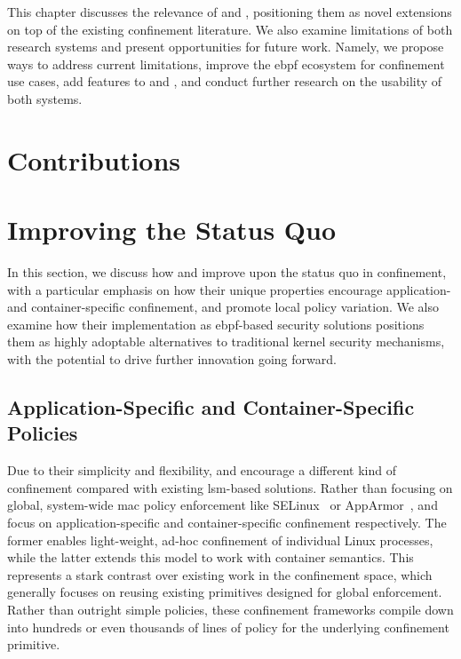 This chapter discusses the relevance of \bpfbox{} and \bpfcontain{}, positioning them as
novel extensions on top of the existing confinement literature. We also examine
limitations of both research systems and present opportunities for future work. Namely, we
propose ways to address current limitations, improve the \gls{ebpf} ecosystem for
confinement use cases, add features to \bpfbox{} and \bpfcontain{}, and conduct further
research on the usability of both systems.

\section{Contributions}%
\label{s:disc-contributions}



\section{Improving the Status Quo}%
\label{s:disc-improving}


In this section, we discuss how \bpfbox{} and \bpfcontain{} improve upon the status quo in
confinement, with a particular emphasis on how their unique properties encourage
application- and container-specific confinement, and promote local policy variation. We
also examine how their implementation as \gls{ebpf}-based security solutions positions
them as highly adoptable alternatives to traditional kernel security mechanisms, with the
potential to drive further innovation going forward.

\subsection{Application-Specific and Container-Specific Policies}

Due to their simplicity and flexibility, \bpfbox{} and \bpfcontain{} encourage a different
kind of confinement compared with existing \gls{lsm}-based solutions. Rather than focusing
on global, system-wide \gls{mac} policy enforcement like
SELinux~\cite{smalley2001_selinux} or AppArmor~\cite{cowan2000_apparmor}, \bpfbox{} and
\bpfcontain{} focus on application-specific and container-specific confinement
respectively. The former enables light-weight, ad-hoc confinement of individual Linux
processes, while the latter extends this model to work with container semantics.  This
represents a stark contrast over existing work in the confinement space, which generally
focuses on reusing existing primitives designed for global enforcement.  Rather than
outright simple policies, these confinement frameworks compile down into hundreds or even
thousands of lines of policy for the underlying confinement primitive.

